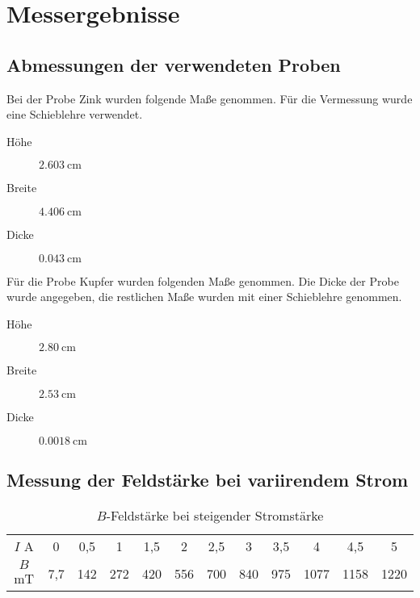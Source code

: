 \section{Messergebnisse}

\subsection{Abmessungen der verwendeten Proben}

Bei der Probe Zink wurden folgende Maße genommen.
Für die Vermessung wurde eine Schieblehre verwendet.

\begin{description}
  \item[Höhe] $\SI{2,603}{\centi\meter}$
  \item[Breite] $\SI{4,406}{\centi\meter}$
  \item[Dicke] $\SI{0,043}{\centi\meter}$
\end{description}

Für die Probe Kupfer wurden folgenden Maße genommen.
Die Dicke der Probe wurde angegeben, die restlichen Maße wurden mit einer
Schieblehre genommen.

\begin{description}
  \item[Höhe] $\SI{2,80}{\centi\meter}$
  \item[Breite] $\SI{2,53}{\centi\meter}$
  \item[Dicke] $\SI{0,0018}{\centi\meter}$
\end{description}

\subsection{Messung der Feldstärke bei variirendem Strom}

\begin{table}
 \centering
 \label{tab:Messergebnisse_Feldstärke_Isteigt}
 \begin{tabular}[width=\textwidth]{S S[table-format=1.1] S[table-format=3.1] S[table-format=3.0] S[table-format=3.1] S[table-format=3.0] S[table-format=3.1] S[table-format=3.0] S[table-format=3.1] S[table-format=4.0] S[table-format=4.1] S[table-format=4.0]}
     \midrule
      $I$  \si{\ampere} & 0 & 0,5 & 1 & 1,5 & 2 & 2,5 & 3 & 3,5 & 4 & 4,5 & 5 \\
      $B$  \si{\milli\tesla} & 7,7 & 142 & 272 & 420 & 556 & 700 & 840 & 975 & 1077 & 1158 & 1220 \\
      \bottomrule
\end{tabular}
  \caption{$B$-Feldstärke bei steigender Stromstärke}
\end{table}


